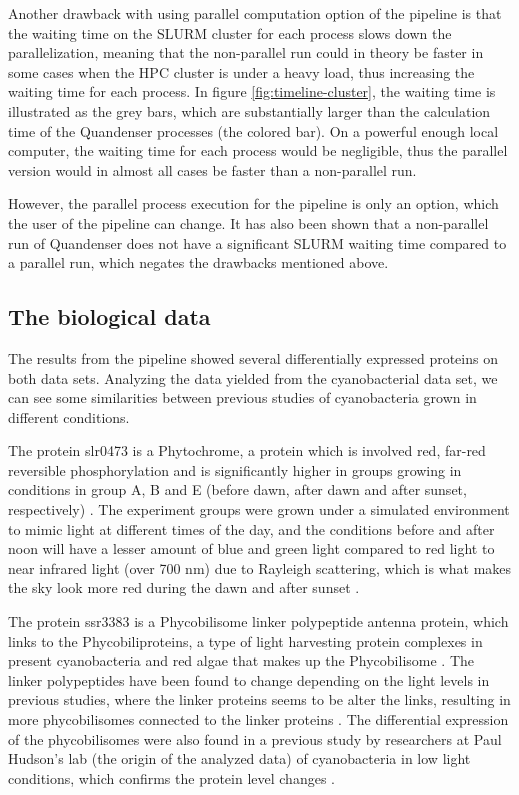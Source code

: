 Another drawback with using parallel computation option of the pipeline is that the waiting time on the SLURM cluster for each process slows down the parallelization, meaning that the non-parallel run could in theory be faster in some cases when the HPC cluster is under a heavy load, thus increasing the waiting time for each process. In figure \ref{fig:timeline-cluster}, the waiting time is illustrated as the grey bars, which are substantially larger than the calculation time of the Quandenser processes (the colored bar). On a powerful enough local computer, the waiting time for each process would be negligible, thus the parallel version would in almost all cases be faster than a non-parallel run.

However, the parallel process execution for the pipeline is only an option, which the user of the pipeline can change. It has also been shown that a non-parallel run of Quandenser does not have a significant SLURM waiting time compared to a parallel run, which negates the drawbacks mentioned above.

\subsection{The biological data}
The results from the pipeline showed several differentially expressed proteins on both data sets. Analyzing the data yielded from the cyanobacterial data set, we can see some similarities between previous studies of cyanobacteria grown in different conditions.

The protein slr0473 is a Phytochrome, a protein which is involved red, far-red reversible phosphorylation and is significantly higher in groups growing in conditions in group A, B and E (before dawn, after dawn and after sunset, respectively) \cite{phytochrome}. The experiment groups were grown under a simulated environment to mimic light at different times of the day, and the conditions before and after noon will have a lesser amount of blue and green light compared to red light to near infrared light (over 700 nm) due to Rayleigh scattering, which is what makes the sky look more red during the dawn and after sunset \cite{rayleigh}.

The protein ssr3383 is a Phycobilisome linker polypeptide antenna protein, which links to the Phycobiliproteins, a type of light harvesting protein complexes in present cyanobacteria and red algae that makes up the Phycobilisome \cite{phycobilisomes}. The linker polypeptides have been found to change depending on the light levels in previous studies, where the linker proteins seems to be alter the links, resulting in more phycobilisomes connected to the linker proteins \cite{cyano-low-light}. The differential expression of the phycobilisomes were also found in a previous study by researchers at Paul Hudson's lab (the origin of the analyzed data) of cyanobacteria in low light conditions, which confirms the protein level changes \cite{michael-jahn-cyano}.

